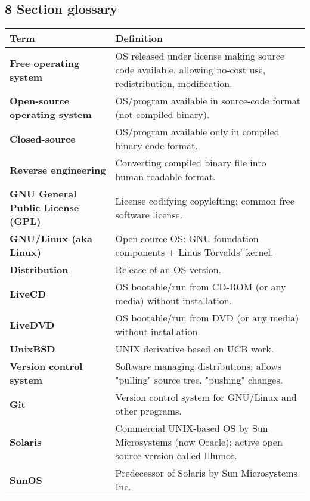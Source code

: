 \documentclass{article}
\begin{document}
\subsection*{8 Section glossary}
\centering
\begin{tabular}{>{\raggedright}p{} >{\raggedright\arraybackslash}p{}}
\toprule
\textbf{Term} & \textbf{Definition} \\
\midrule
\textbf{Free operating system} & OS released under license making source code available, allowing no-cost use, redistribution, modification. \\
\textbf{Open-source operating system} & OS/program available in source-code format (not compiled binary). \\
\textbf{Closed-source} & OS/program available only in compiled binary code format. \\
\textbf{Reverse engineering} & Converting compiled binary file into human-readable format. \\
\textbf{GNU General Public License (GPL)} & License codifying copylefting; common free software license. \\
\textbf{GNU/Linux (aka Linux)} & Open-source OS: GNU foundation components + Linus Torvalds' kernel. \\
\textbf{Distribution} & Release of an OS version. \\
\textbf{LiveCD} & OS bootable/run from CD-ROM (or any media) without installation. \\
\textbf{LiveDVD} & OS bootable/run from DVD (or any media) without installation. \\
\textbf{UnixBSD} & UNIX derivative based on UCB work. \\
\textbf{Version control system} & Software managing distributions; allows "pulling" source tree, "pushing" changes. \\
\textbf{Git} & Version control system for GNU/Linux and other programs. \\
\textbf{Solaris} & Commercial UNIX-based OS by Sun Microsystems (now Oracle); active open source version called Illumos. \\
\textbf{SunOS} & Predecessor of Solaris by Sun Microsystems Inc. \\
\bottomrule
\end{tabular}
\vspace{\baselineskip}
\end{document}
